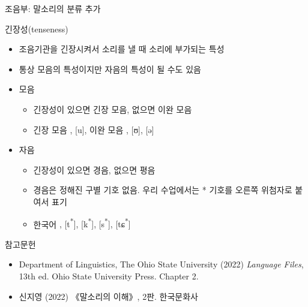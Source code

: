 \documentclass[11pt, aspectratio=169]{beamer}
\newcommand{\texttnr}[1]{{\tnrfont #1}}
\newcommand{\textds}[1]{{\ipafont #1}}
\begin{document}
\begin{frame}[t]{조음부: 말소리의 분류 추가}
    \begin{block}{긴장성(tenseness)}
        \begin{itemize}
            \item 조음기관을 긴장시켜서 소리를 낼 때 소리에 부가되는 특성
            \item 통상 모음의 특성이지만 자음의 특성이 될 수도 있음
            \item 모음
                \begin{itemize}
                    \item 긴장성이 있으면 긴장 모음, 없으면 이완 모음
                    \item 긴장 모음 \textds{[i], [u]}, 이완 모음 \textds{[ɪ], [ʊ], [ə]}
                \end{itemize}
            \item 자음
                \begin{itemize}
                    \item 긴장성이 있으면 경음, 없으면 평음
                    \item 경음은 정해진 구별 기호 없음. 우리 수업에서는 * 기호를 오른쪽 위첨자로 붙여서 표기
                    \item 한국어 \textds{[p\textsuperscript{*}], [t\textsuperscript{*}], [k\textsuperscript{*}], [s\textsuperscript{*}], [tɕ\textsuperscript{*}]}
                \end{itemize}
        \end{itemize}
    \end{block}    
\end{frame}

\begin{frame}[t]{참고문헌}
  \begin{itemize}
    \item \texttnr{Department of Linguistics, The Ohio State University (2022) \textit{Language Files}, 13th ed. Ohio State University Press. Chapter 2.}
    \item 신지영 (2022) 《말소리의 이해》, 2판. 한국문화사
  \end{itemize}
    
\end{frame}
\end{document}
